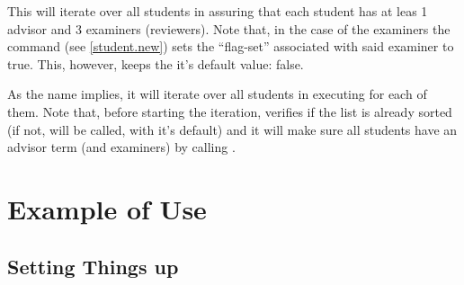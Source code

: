 \documentclass[10pt]{article}
\begin{document}


\begin{codedescribe}{\listemptytermsifnone}
\begin{codesyntax}
\end{codesyntax}
This will iterate over all students in  assuring that each student has at leas 1 advisor and 3 examiners (reviewers). Note that, in the case of the examiners the \tsobj{\examiner} command (see \ref{student.new}) sets the ``flag-set'' associated with said examiner to true. This, however, keeps the it's default value: false.
\end{codedescribe}



\begin{codedescribe}{\studentlistiterate}
\begin{codesyntax}
\end{codesyntax}
As the name implies, it will iterate over all students in  executing  for each of them. Note that, before starting the iteration, \tsobj{\studentlistiterate} verifies if the list is already sorted (if not, \tsobj{\studentlistsort} will be called, with it's default) and it will make sure all students have an advisor term (and examiners) by calling \tsobj{\listemptytermsifnone}.
\end{codedescribe}


\newpage
\section{Example of Use}
\subsection{Setting Things up}

\begin{codestore}

  
\end{codestore}
\end{document}
